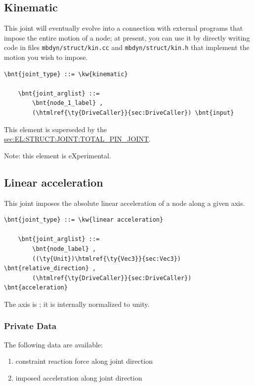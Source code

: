 


\subsection{Kinematic}
This joint will eventually evolve into a connection with external programs
that impose the entire motion of a node; at present, you can use it
by directly writing code in files \verb;mbdyn/struct/kin.cc; and
\verb;mbdyn/struct/kin.h; that implement the motion you wish to impose.
\begin{Verbatim}[commandchars=\\\{\}]
    \bnt{joint_type} ::= \kw{kinematic}

    \bnt{joint_arglist} ::= 
        \bnt{node_1_label} ,
        (\htmlref{\ty{DriveCaller}}{sec:DriveCaller}) \bnt{input}
\end{Verbatim}
This element is superseded by the
\hyperref{\kw{total pin joint}}{\kw{total pin joint}, see Section~}{}{sec:EL:STRUCT:JOINT:TOTAL_PIN_JOINT}.

Note: this element is eXperimental.

\subsection{Linear acceleration}
This joint imposes the absolute linear acceleration of a node
along a given axis.
\begin{Verbatim}[commandchars=\\\{\}]
    \bnt{joint_type} ::= \kw{linear acceleration}

    \bnt{joint_arglist} ::=
        \bnt{node_label} ,
        ((\ty{Unit})\htmlref{\ty{Vec3}}{sec:Vec3}) \bnt{relative_direction} , 
        (\htmlref{\ty{DriveCaller}}{sec:DriveCaller}) \bnt{acceleration}
\end{Verbatim}
The axis is ; it is internally normalized to unity.

\subsubsection{Private Data}
The following data are available:
\begin{enumerate}
\item {} constraint reaction force along joint direction
\item {} imposed acceleration along joint direction
\end{enumerate}

